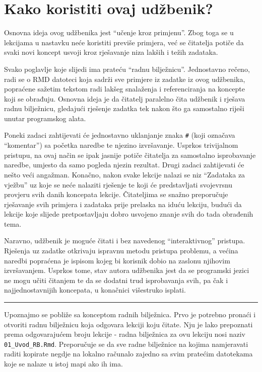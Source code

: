 \documentclass[]{book}
\theoremstyle{definition}
\theoremstyle{definition}
\theoremstyle{definition}
\theoremstyle{remark}
\begin{document}
\section{Kako koristiti ovaj
udžbenik?}\label{kako-koristiti-ovaj-udzbenik}

Osnovna ideja ovog udžbenika jest ``učenje kroz primjenu''. Zbog toga se
u lekcijama u nastavku neće koristiti previše primjera, već se čitatelja
potiče da svaki novi koncept usvoji kroz rješavanje niza lakših i težih
zadataka.

Svako poglavlje koje slijedi ima prateću ``radnu bilježnicu''.
Jednostavno rečeno, radi se o RMD datoteci koja sadrži sve primjere iz
zadatke iz ovog udžbenika, popraćene sažetim tekstom radi lakšeg
snalaženja i referenciranja na koncepte koji se obrađuju. Osnovna ideja
je da čitatelj paralelno čita udžbenik i rješava radnu bilježnicu,
gledajući rješenje zadatka tek nakon što ga samostalno riješi unutar
programskog alata.

Poneki zadaci zahtijevati će jednostavno uklanjanje znaka \texttt{\#}
(koji označava ``komentar'') sa početka naredbe te njezino izvršavanje.
Usprkos trivijalnom pristupu, na ovaj način se ipak jasnije potiče
čitatelja za samostalno isprobavanje naredbe, umjesto da samo pogleda
njezin rezultat. Drugi zadaci zahtijevati će nešto veći angažman.
Konačno, nakon svake lekcije nalazi se niz ``Zadataka za vježbu'' uz
koje se neće nalaziti rješenje te koji će predstavljati svojevrsnu
provjeru svih danih koncepata lekcije. Čitateljima se snažno preporučuje
rješavanje svih primjera i zadataka prije prelaska na iduću lekciju,
budući da lekcije koje slijede pretpostavljaju dobro usvojeno znanje
svih do tada obrađenih tema.

Naravno, udžbenik je moguće čitati i bez navedenog ``interaktivnog''
pristupa. Rješenja uz zadatke otkrivaju ispravnu metodu pristupa
problemu, a većina naredbi popraćena je ispisom kojeg bi korisnik dobio
na zaslonu njihovim izvršavanjem. Usprkos tome, stav autora udžbenika
jest da se programski jezici ne mogu učiti čitanjem te da se dodatni
trud isprobavanja svih, pa čak i najjednostavnijih koncepata, u
konačnici višestruko isplati.

\begin{center}\rule{0.5\linewidth}{\linethickness}\end{center}

Upoznajmo se pobliže sa konceptom radnih bilježnica. Prvo je potrebno
pronaći i otvoriti radnu bilježnicu koja odgovara lekciji koju čitate.
Nju je lako prepoznati prema odgovarajućem broju lekcije - radna
bilježnica za ovu lekciju nosi naziv \texttt{01\_Uvod\_RB.Rmd}.
Preporučuje se da sve radne bilježnice na kojima namjeravati raditi
kopirate negdje na lokalno računalo zajedno sa svim pratećim datotekama
koje se nalaze u istoj mapi ako ih ima.
\end{document}
